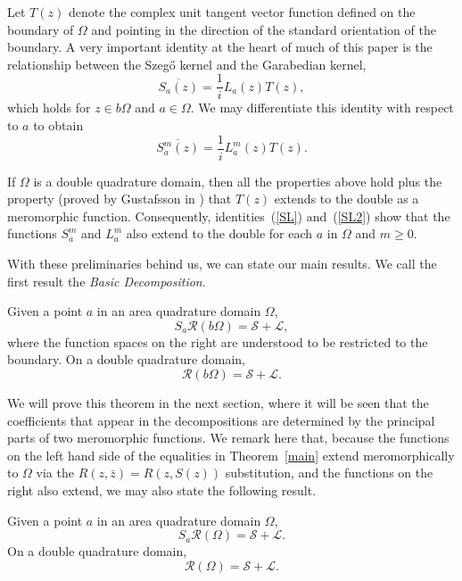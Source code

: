 \documentclass[12pt]{amsart}
\newcommand\Om{\Omega}
\numberwithin{equation}{section}
\begin{document}
Let $T(z)$ denote the complex unit tangent vector
function defined on the boundary of $\Om$ and pointing
in the direction of the standard orientation of the
boundary.  A very important identity at the heart of much
of this paper is the relationship between the Szeg\H o
kernel and the Garabedian kernel,
\begin{equation}
\label{SL}
\overline{S_a(z)}=\frac{1}{i}L_a(z)T(z),
\end{equation}
which holds for $z\in b\Om$ and $a\in\Om$.
We may differentiate this identity with respect to
$a$ to obtain
\begin{equation}
\label{SL2}
\overline{S_a^m(z)}=\frac{1}{i}L_a^m(z)T(z).
\end{equation}

If $\Om$ is a double quadrature domain, then
all the properties above hold plus the property
(proved by Gustafsson in \cite{G2})
that $T(z)$ extends to the double as a meromorphic
function. Consequently, identities~(\ref{SL})
and~(\ref{SL2}) show that the functions $S_a^m$ and
$L_a^m$ also extend to the double for each $a$ in
$\Om$ and $m\ge0$.

With these preliminaries behind us, we can state our
main results. We call the first result the {\it Basic
Decomposition}.

\begin{thm}
\label{main}
Given a point $a$ in an area quadrature domain $\Om$, 
$$S_a{\mathcal R}(b\Om)=\mathcal S+\mathcal L,$$
where the function spaces on the right are understood
to be restricted to the boundary. On a double
quadrature domain,
$${\mathcal R}(b\Om)=\mathcal S+\mathcal L.$$
\end{thm}

We will prove this theorem in the next section,
where it will be seen that the coefficients that
appear in the decompositions are determined by
the principal parts of two meromorphic functions.
We remark here that, because the functions on the
left hand side of the equalities in Theorem~\ref{main}
extend meromorphically to $\Om$ via the
$R(z,\bar z)=R(z,S(z))$ substitution, and the functions
on the right also extend, we may also state the
following result.

\begin{thm}
\label{main2}
Given a point $a$ in an area quadrature domain $\Om$, 
$$S_a{\mathcal R}(\Om)=\mathcal S+\mathcal L.$$
On a double quadrature domain,
$${\mathcal R}(\Om)=\mathcal S+\mathcal L.$$
\end{thm}
\end{document}
